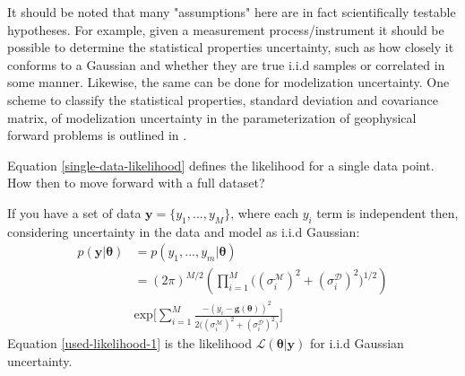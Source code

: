 \begin{tcolorbox}[enhanced jigsaw,breakable,pad at break*=1mm,title=Technical figure 2: Applied likelihood derivation, title filled,fonttitle=\sffamily\bfseries,fontupper=\sffamily\scriptsize]
\begin{multicols}{2}
It should be noted that many "assumptions" here are in fact scientifically testable hypotheses. For example, given a measurement process/instrument it should be possible to determine the statistical properties uncertainty, such as how closely it conforms to a Gaussian and whether they are true i.i.d samples or correlated in some manner. Likewise, the same can be done for modelization uncertainty. One scheme to classify the statistical properties, standard deviation and covariance matrix, of modelization uncertainty in the parameterization of geophysical forward problems is outlined in \citet{afonso2013b}.\par

Equation \ref{single-data-likelihood} defines the likelihood for a single data point. How then to move forward with a full dataset?\par

If you have a set of data $\bm{y} = \{y_1,...,y_M\}$, where each $y_i$ term is independent then, considering uncertainty in the data and model as i.i.d Gaussian:
\begin{equation}
\begin{split}
p(\bm{y}|\bm{\theta}) &= p(y_1,...,y_m|\bm{\theta})\\
&= (2\pi)^{M/2}(\prod_{i = 1}^{M}\big((\sigma^{\mathcal{M}}_i)^2+(\sigma^{\mathcal{D}}_i)^2\big)^{1/2})\\ 
& \text{exp}\bigg[\sum_{i = 1}^{M}\frac{-(y_i-\bm{g}({\bm{\theta}}))^2}{2\big((\sigma^{\mathcal{M}}_i)^2+(\sigma^{\mathcal{D}}_i)^2\big)}\bigg]
\label{used-likelihood-1}
\end{split}
\end{equation}
Equation \ref{used-likelihood-1} is the likelihood $\mathcal{L}(\bm{\theta}|\bm{y})$ for i.i.d Gaussian uncertainty.\par


\end{multicols}
\end{tcolorbox}
